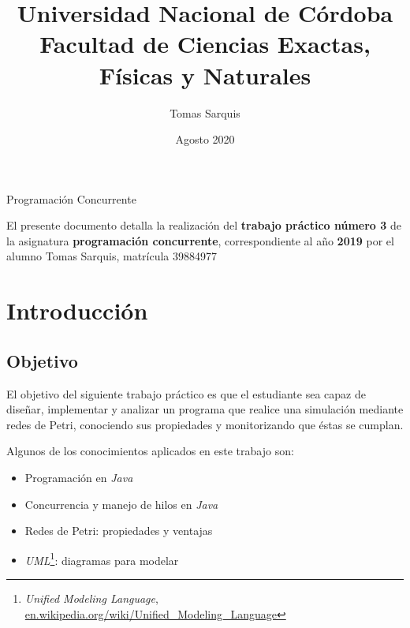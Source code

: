 \documentclass{article}
\title{Universidad Nacional de Córdoba\\Facultad de Ciencias Exactas, Físicas y Naturales}
\author{Tomas Sarquis}
\date{Agosto 2020}
\newcommand{\fnuml}{\emph{Unified Modeling Language}, \url{en.wikipedia.org/wiki/Unified_Modeling_Language}}
\begin{document}
    \begin{titlingpage}
        \maketitle
        \null \null \null \null
        \begin{center}
            {\huge Programación Concurrente}
        \end{center}
        \vspace*{\fill}
        \justify
        El presente documento detalla la realización del \textbf{trabajo práctico número 3} 
        de la asignatura \textbf{programación concurrente}, correspondiente al año \textbf{2019}
        por el alumno Tomas Sarquis, matrícula 39884977
        \vspace*{\fill}
    \end{titlingpage}
    \tableofcontents 
    \newpage
    \section{Introducción}
    \subsection{Objetivo}
    El objetivo del siguiente trabajo práctico es que el estudiante sea capaz de diseñar,
    implementar y analizar un programa que realice una simulación mediante redes de Petri,
    conociendo sus propiedades y monitorizando que éstas se cumplan. \par
    Algunos de los conocimientos aplicados en este trabajo son:
    \begin{itemize}
        \item Programación en \emph{Java}
        \item Concurrencia y manejo de hilos en \emph{Java}
        \item Redes de Petri: propiedades y ventajas
        \item \emph{UML}\footnote{\fnuml}: diagramas para modelar
    \end{itemize}
\end{document}
